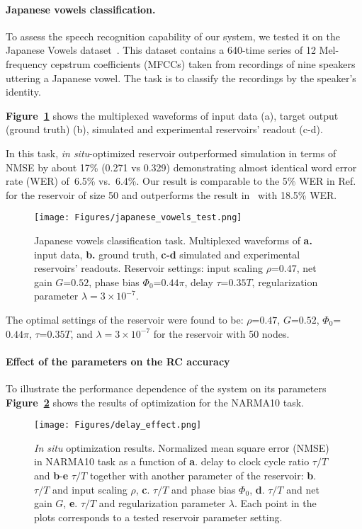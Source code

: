 \documentclass{WileyMSP-template}
\begin{document}
\FloatBarrier

\paragraph{Japanese vowels classification.}
To assess the speech recognition capability of our system, we tested it on the Japanese Vowels dataset~\cite{ref:mineichikudo1999}. 
This dataset contains a 640-time series of 12 Mel-frequency cepstrum coefficients (MFCCs) taken from recordings of nine speakers uttering a Japanese vowel.
The task is to classify the recordings by the speaker's identity.

\textbf{Figure~\ref{fig:japanese_vowels}} shows the multiplexed waveforms of input data (a), target output (ground truth) (b), simulated and experimental reservoirs' readout (c-d).

In this task, \emph{in situ}-optimized reservoir outperformed simulation in terms of NMSE by about 17\% (0.271 vs 0.329) demonstrating almost identical word error rate (WER) of~6.5\% vs.~6.4\%.
Our result is comparable to the 5\% WER in Ref.~\cite{ref:picco2024} for the reservoir of size 50 and outperforms the result in~\cite{ref:paudel2020} with 18.5\% WER.

\begin{figure}[htpb]
  \centering
  \texttt{[image: Figures/japanese\_vowels\_test.png]}
  \caption{Japanese vowels classification task. Multiplexed waveforms of \textbf{a.} input data, \textbf{b.} ground truth, \textbf{c-d} simulated and experimental reservoirs' readouts. Reservoir settings: input scaling $\rho$=$0.47$, net gain $G$=$0.52$, phase bias $\Phi_0$=$0.44\pi$, delay $\tau$=$0.35T$, regularization parameter $\lambda=3\times10^{-7}$.}
  \label{fig:japanese_vowels}
\end{figure}

\FloatBarrier

The optimal settings of the reservoir were found to be: $\rho$=$0.47$, $G$=$0.52$, $\Phi_0$=$0.44\pi$, $\tau$=$0.35T$, and $\lambda=3\times10^{-7}$ for the reservoir with 50 nodes.

\paragraph{Effect of the parameters on the RC accuracy}
To illustrate the performance dependence of the system on its parameters \textbf{Figure~\ref{fig:delay_effect}} shows the results of optimization for the NARMA10 task.
\begin{figure}
    \centering
    \texttt{[image: Figures/delay\_effect.png]}
    \caption{\emph{In situ} optimization results. Normalized mean square error (NMSE) in NARMA10 task as a function of \textbf{a}. delay to clock cycle ratio $\tau/T$ and \textbf{b}-\textbf{e} $\tau/T$ together with another parameter of the reservoir:
    \textbf{b}. $\tau/T$ and input scaling $\rho$,
    \textbf{c}. $\tau/T$ and phase bias $\Phi_0$,
    \textbf{d}. $\tau/T$ and net gain $G$,
    \textbf{e}. $\tau/T$ and regularization parameter $\lambda$.
    Each point in the plots corresponds to a tested reservoir parameter setting.}
    \label{fig:delay_effect}
\end{figure}
\end{document}
